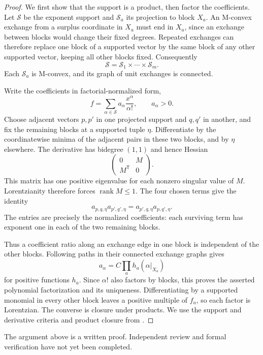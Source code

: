 \begin{proof}
We first show that the support is a product, then factor the coefficients.
Let $\mathcal S$ be the exponent support and $\mathcal S_a$ its projection
to block $X_a$. An M-convex exchange from a surplus coordinate in $X_a$
must end in $X_a$, since an exchange between blocks would change their
fixed degrees. Repeated exchanges can therefore replace one block of a
supported vector by the same block of any other supported vector, keeping
all other blocks fixed. Consequently
\[
 \mathcal S=\mathcal S_1\times\dotsb\times\mathcal S_m.
\]
Each $\mathcal S_a$ is M-convex, and its graph of unit exchanges is connected.

Write the coefficients in factorial-normalized form,
\[
 f=\sum_{\alpha\in\mathcal S}a_\alpha\frac{x^\alpha}{\alpha!},
 \qquad a_\alpha>0.
\]
Choose adjacent vectors $p,p'$ in one projected support and $q,q'$ in
another, and fix the remaining blocks at a supported tuple $\eta$.
Differentiate by the coordinatewise minima of the adjacent pairs in
these two blocks, and by $\eta$ elsewhere. The derivative has bidegree
$(1,1)$ and hence Hessian
\[
 \begin{pmatrix}0&M\\M^{\mathsf T}&0\end{pmatrix}.
\]
This matrix has one positive eigenvalue for each nonzero singular value
of $M$. Lorentzianity therefore forces $\operatorname{rank}M\leq1$.
The four chosen terms give the identity
\[
 a_{p,q,\eta}a_{p',q',\eta}
 =a_{p',q,\eta}a_{p,q',\eta}.
\]
The entries are precisely the normalized coefficients: each surviving
term has exponent one in each of the two remaining blocks.

Thus a coefficient ratio along an exchange edge in one block is
independent of the other blocks. Following paths in their connected
exchange graphs gives
\[
 a_\alpha=C\prod_a h_a(\alpha|_{X_a})
\]
for positive functions $h_a$. Since $\alpha!$ also factors by blocks,
this proves the asserted polynomial factorization and its uniqueness.
Differentiating by a supported monomial in every other block leaves a
positive multiple of $f_a$, so each factor is Lorentzian. The converse
is closure under products. We use the support and derivative criteria
and product closure from \cite{BrandenHuh2020}.
\end{proof}

\begin{remark}
The argument above is a written proof. Independent review and formal
verification have not yet been completed.
\end{remark}

